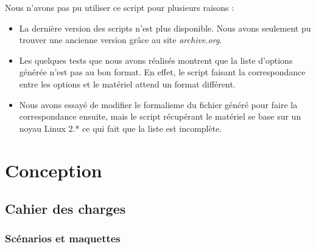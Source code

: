 ﻿\documentclass[17pts]{report}
\begin{document}
Nous n'avons pas pu utiliser ce script pour plusieurs raisons :
\begin{itemize}
    \item La dernière version des scripts n'est plus disponible. Nous avons
        seulement pu trouver une ancienne version grâce au site
        \textit{archive.org}.
    \item Les quelques tests que nous avons réalisés montrent que la liste
        d'options générée n'est pas au bon format. En effet, le script faisant
        la correspondance entre les options et le matériel attend un format
        différent.
    \item Nous avons essayé de modifier le formalisme du fichier généré pour
        faire la correspondance ensuite, mais le script récupérant le matériel
        se base sur un noyau Linux 2.* ce qui fait que la liste est incomplète.
\end{itemize}

\chapter{Conception}\thispagestyle{IHA-fancy-style}
\label{cha:Conception}
    \section{Cahier des charges}
    \label{sec:Cahier des charges}
        \subsection{Scénarios et maquettes}
        \label{sub:Scénarios et maquettes}
\end{document}
